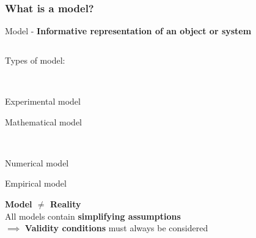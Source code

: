 \documentclass{beamer}
\begin{document}
\begin{frame}
  \frametitle{What is a model?}

  \vspace{-0.45cm}
  
  Model - \textbf{Informative representation of an object or system} \\

  \begin{columns}[t]

    \begin{column}{0.5\paperwidth}

      \begin{minipage}[t][.6\textheight][t]{\linewidth}

            Types of model:
            
            \begin{itemize}
            \item {\color{gray}{Conceptual model}\\
            \item Experimental model}
            \item Mathematical model \\
              \begin{itemize}
              \item {\color{gray}{Analytical model} \\
              \item Numerical model}
              \item Empirical model
              \end{itemize}
            \end{itemize}

            \centering
            
            \textbf{Model $\neq$ Reality }\\

            All models contain \textbf{simplifying assumptions} \\

            $\implies$ \textbf{Validity conditions} must always be considered \\

            
      \end{minipage}
      
    \end{column}

    \begin{column}{0.5\paperwidth}


\end{column}
\end{columns}
\end{frame}
\end{document}
